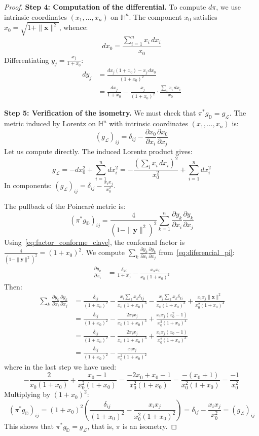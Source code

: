 \begin{proof}
\textbf{Step 4: Computation of the differential.}
To compute $d\pi$, we use intrinsic coordinates $(x_1, \ldots, x_n)$ on $\mathbb{H}^n$. The component $x_0$ satisfies $x_0 = \sqrt{1 + \|\mathbf{x}\|^2}$, whence:
\[
dx_0 = \frac{\sum_{i=1}^n x_i \, dx_i}{x_0}
\]
Differentiating $y_j = \frac{x_j}{1+x_0}$:
\begin{align}
dy_j &= \frac{dx_j(1+x_0) - x_j \, dx_0}{(1+x_0)^2} \nonumber \\
&= \frac{dx_j}{1+x_0} - \frac{x_j}{(1+x_0)^2} \cdot \frac{\sum_i x_i \, dx_i}{x_0} \label{eq:diferencial_pi}
\end{align}

\textbf{Step 5: Verification of the isometry.}
We must check that $\pi^* g_{\mathbb{D}} = g_{\mathcal{L}}$. The metric induced by Lorentz on $\mathbb{H}^n$ with intrinsic coordinates $(x_1, \ldots, x_n)$ is:
\[
(g_{\mathcal{L}})_{ij} = \delta_{ij} - \frac{\partial x_0}{\partial x_i} \frac{\partial x_0}{\partial x_j}
\]
Let us compute directly. The induced Lorentz product gives:
\[
g_{\mathcal{L}} = -dx_0^2 + \sum_{i=1}^n dx_i^2 = -\frac{(\sum_i x_i \, dx_i)^2}{x_0^2} + \sum_{i=1}^n dx_i^2
\]
In components: $(g_{\mathcal{L}})_{ij} = \delta_{ij} - \frac{x_i x_j}{x_0^2}$.

The pullback of the Poincaré metric is:
\[
(\pi^* g_{\mathbb{D}})_{ij} = \frac{4}{(1-\|\mathbf{y}\|^2)^2} \sum_{k=1}^n \frac{\partial y_k}{\partial x_i} \frac{\partial y_k}{\partial x_j}
\]
Using~\eqref{eq:factor_conforme_clave}, the conformal factor is $\frac{4}{(1-\|\mathbf{y}\|^2)^2} = (1+x_0)^2$. We compute $\sum_k \frac{\partial y_k}{\partial x_i}\frac{\partial y_k}{\partial x_j}$ from~\eqref{eq:diferencial_pi}:
\begin{align*}
\frac{\partial y_k}{\partial x_i} &= \frac{\delta_{ki}}{1+x_0} - \frac{x_k x_i}{x_0(1+x_0)^2}
\end{align*}
Then:
\begin{align*}
\sum_{k} \frac{\partial y_k}{\partial x_i}\frac{\partial y_k}{\partial x_j} &= \frac{\delta_{ij}}{(1+x_0)^2} - \frac{x_i \sum_k x_k \delta_{kj}}{x_0(1+x_0)^3} - \frac{x_j \sum_k x_k \delta_{ki}}{x_0(1+x_0)^3} + \frac{x_i x_j \|\mathbf{x}\|^2}{x_0^2(1+x_0)^4} \\
&= \frac{\delta_{ij}}{(1+x_0)^2} - \frac{2 x_i x_j}{x_0(1+x_0)^3} + \frac{x_i x_j (x_0^2 - 1)}{x_0^2(1+x_0)^4} \\
&= \frac{\delta_{ij}}{(1+x_0)^2} - \frac{2 x_i x_j}{x_0(1+x_0)^3} + \frac{x_i x_j (x_0 - 1)}{x_0^2(1+x_0)^3} \\
&= \frac{\delta_{ij}}{(1+x_0)^2} - \frac{x_i x_j}{x_0^2(1+x_0)^2}
\end{align*}
where in the last step we have used:
\[
-\frac{2}{x_0(1+x_0)} + \frac{x_0-1}{x_0^2(1+x_0)} = \frac{-2x_0 + x_0 - 1}{x_0^2(1+x_0)} = \frac{-(x_0+1)}{x_0^2(1+x_0)} = \frac{-1}{x_0^2}
\]
Multiplying by $(1+x_0)^2$:
\[
(\pi^* g_{\mathbb{D}})_{ij} = (1+x_0)^2 \left(\frac{\delta_{ij}}{(1+x_0)^2} - \frac{x_i x_j}{x_0^2(1+x_0)^2}\right) = \delta_{ij} - \frac{x_i x_j}{x_0^2} = (g_{\mathcal{L}})_{ij}
\]
This shows that $\pi^* g_{\mathbb{D}} = g_{\mathcal{L}}$, that is, $\pi$ is an isometry.
\end{proof}


